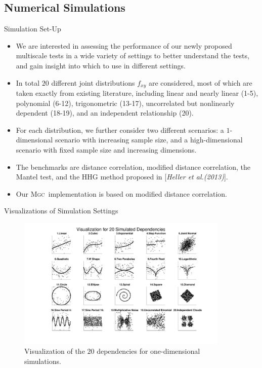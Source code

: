 \documentclass{beamer}
\providecommand{\sct}[1]{{\normalfont\textsc{#1}}}
\newcommand{\Mgc}{\sct{Mgc}}
\begin{document}
\subsection{Numerical Simulations}
\begin{frame}{Simulation Set-Up}
\begin{itemize}[<+->]
\item We are interested in assessing the performance of our newly proposed multiscale tests in a wide variety of settings to better understand the tests, and gain insight into which to use in different settings. 
\item In total $20$ different joint distributions $f_{xy}$ are considered, most of which are taken exactly from existing literature, including linear and nearly linear  (1-5), polynomial   (6-12), trigonometric (13-17), uncorrelated but nonlinearly dependent  (18-19), and an independent relationship (20).
\item For each distribution, we further consider two different scenarios: a $1$-dimensional scenario with increasing sample size, and a high-dimensional scenario with fixed sample size and increasing dimensions.
\item The benchmarks are distance correlation, modified distance correlation, the Mantel test, and the HHG method proposed in [\textit{Heller et al.(2013)}]\cite{HellerGorfine2013}.
\item Our \Mgc~implementation is based on modified distance correlation.
\end{itemize}
\end{frame}

\begin{frame}{Visualizations of Simulation Settings}
\begin{figure}[ht]
  \centering
  \includegraphics[width=0.9\textwidth]{../Figures/FigSimVisual}
	\caption{Visualization of the $20$ dependencies for one-dimensional simulations. 
}
	\label{f:dependencies}
\end{figure}
\end{frame}
\end{document}
